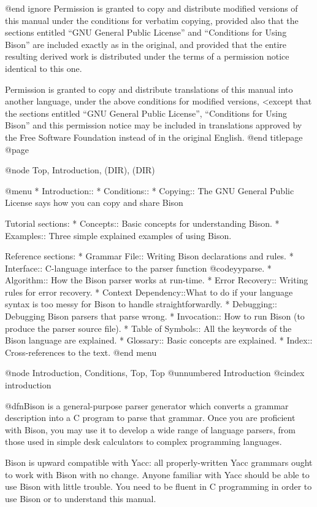 @end ignore
Permission is granted to copy and distribute modified versions of this
manual under the conditions for verbatim copying, provided also that the
sections entitled ``GNU General Public License'' and ``Conditions for
Using Bison'' are included exactly as in the original, and provided that
the entire resulting derived work is distributed under the terms of a
permission notice identical to this one.

Permission is granted to copy and distribute translations of this manual
into another language, under the above conditions for modified versions,
<except that the sections entitled ``GNU General Public License'',
``Conditions for Using Bison'' and this permission notice may be
included in translations approved by the Free Software Foundation
instead of in the original English.
@end titlepage
@page

@node Top, Introduction, (DIR), (DIR)

@menu
* Introduction::
* Conditions::
* Copying::           The GNU General Public License says
                        how you can copy and share Bison

Tutorial sections:
* Concepts::          Basic concepts for understanding Bison.
* Examples::          Three simple explained examples of using Bison.

Reference sections:
* Grammar File::      Writing Bison declarations and rules.
* Interface::         C-language interface to the parser function @code{yyparse}.
* Algorithm::         How the Bison parser works at run-time.
* Error Recovery::    Writing rules for error recovery.
* Context Dependency::What to do if your language syntax is too
			messy for Bison to handle straightforwardly.
* Debugging::         Debugging Bison parsers that parse wrong.
* Invocation::        How to run Bison (to produce the parser source file).
* Table of Symbols::  All the keywords of the Bison language are explained.
* Glossary::          Basic concepts are explained.
* Index::             Cross-references to the text.
@end menu

@node Introduction, Conditions, Top, Top
@unnumbered Introduction
@cindex introduction

@dfn{Bison} is a general-purpose parser generator which converts a grammar
description into a C program to parse that grammar.  Once you are
proficient with Bison, you may use it to develop a wide range of language
parsers, from those used in simple desk calculators to complex programming
languages.

Bison is upward compatible with Yacc: all properly-written Yacc grammars
ought to work with Bison with no change.  Anyone familiar with Yacc
should be able to use Bison with little trouble.  You need to be fluent in
C programming in order to use Bison or to understand this manual.


